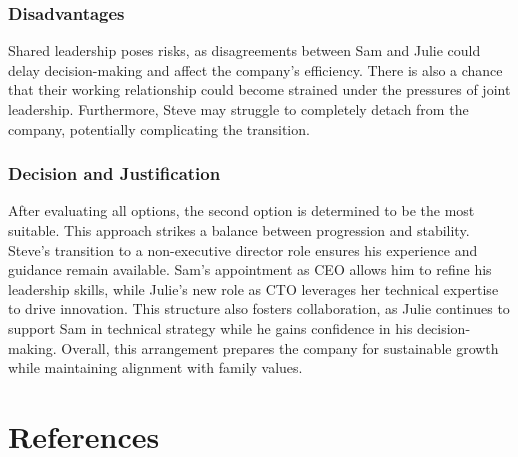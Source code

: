 \documentclass[a4paper,10pt]{article}
\begin{document}
\subsubsection*{Disadvantages}
Shared leadership poses risks, as disagreements between Sam and Julie could delay decision-making and affect the company’s efficiency. There is also a chance that their working relationship could become strained under the pressures of joint leadership. Furthermore, Steve may struggle to completely detach from the company, potentially complicating the transition.

\subsubsection*{Decision and Justification}

After evaluating all options, the second option is determined to be the most suitable. This approach strikes a balance between progression and stability. Steve’s transition to a non-executive director role ensures his experience and guidance remain available. Sam’s appointment as CEO allows him to refine his leadership skills, while Julie’s new role as CTO leverages her technical expertise to drive innovation. This structure also fosters collaboration, as Julie continues to support Sam in technical strategy while he gains confidence in his decision-making. Overall, this arrangement prepares the company for sustainable growth while maintaining alignment with family values.


\section{References}
\end{document}
